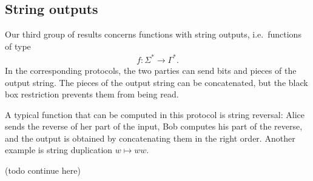 \subsection{String outputs}
\label{sec:intro-strings}

Our third group of results concerns functions with string outputs, i.e.~functions of type
\begin{align*}
f : \Sigma^* \to \Gamma^*.
\end{align*}
In the corresponding protocols, the two parties can send bits and pieces of the output string. The pieces of the output string can be concatenated, but the black box restriction prevents them from being read. 

\begin{myexample}\label{ex:reverse-duplicate}
    A typical function that can be computed in this protocol is string reversal: Alice sends the reverse of her part of the input, Bob computes his part of the reverse, and the output is obtained by concatenating them in the right order. Another example is string duplication $w \mapsto ww$. 
\end{myexample}


\begin{center}
    (todo continue here)
\end{center}